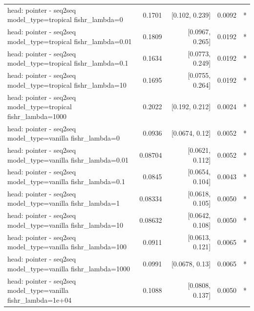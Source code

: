 \documentclass[10pt]{article}
\makeatletter
\newcommand{\stackcell}[1]{\begin{tabular}[t]{@{}l@{}}#1\end{tabular}}
\makeatother
\begin{document}
{\begin{longtable}{lrrrl}
\stackcell{head: pointer - seq2seq\\\footnotesize model\_type=tropical fishr\_lambda=0 } & 0.1701 & [0.102, 0.239] & 0.0092 & *\\
\stackcell{head: pointer - seq2seq\\\footnotesize model\_type=tropical fishr\_lambda=0.01 } & 0.1809 & [0.0967, 0.265] & 0.0192 & *\\
\stackcell{head: pointer - seq2seq\\\footnotesize model\_type=tropical fishr\_lambda=0.1 } & 0.1634 & [0.0773, 0.249] & 0.0192 & *\\
\stackcell{head: pointer - seq2seq\\\footnotesize model\_type=tropical fishr\_lambda=10 } & 0.1695 & [0.0755, 0.264] & 0.0192 & *\\
\stackcell{head: pointer - seq2seq\\\footnotesize model\_type=tropical fishr\_lambda=1000 } & 0.2022 & [0.192, 0.212] & 0.0024 & *\\
\stackcell{head: pointer - seq2seq\\\footnotesize model\_type=vanilla fishr\_lambda=0 } & 0.0936 & [0.0674, 0.12] & 0.0052 & *\\
\stackcell{head: pointer - seq2seq\\\footnotesize model\_type=vanilla fishr\_lambda=0.01 } & 0.08704 & [0.0621, 0.112] & 0.0052 & *\\
\stackcell{head: pointer - seq2seq\\\footnotesize model\_type=vanilla fishr\_lambda=0.1 } & 0.0845 & [0.0654, 0.104] & 0.0043 & *\\
\stackcell{head: pointer - seq2seq\\\footnotesize model\_type=vanilla fishr\_lambda=1 } & 0.08334 & [0.0618, 0.105] & 0.0050 & *\\
\stackcell{head: pointer - seq2seq\\\footnotesize model\_type=vanilla fishr\_lambda=10 } & 0.08632 & [0.0642, 0.108] & 0.0050 & *\\
\stackcell{head: pointer - seq2seq\\\footnotesize model\_type=vanilla fishr\_lambda=100 } & 0.0911 & [0.0613, 0.121] & 0.0065 & *\\
\stackcell{head: pointer - seq2seq\\\footnotesize model\_type=vanilla fishr\_lambda=1000 } & 0.0991 & [0.0678, 0.13] & 0.0065 & *\\
\stackcell{head: pointer - seq2seq\\\footnotesize model\_type=vanilla fishr\_lambda=1e+04 } & 0.1088 & [0.0808, 0.137] & 0.0050 & *\\
\bottomrule
\end{longtable}
}
\end{document}
